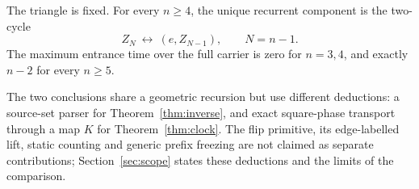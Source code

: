 \begin{theorem}\label{thm:clock}
The triangle is fixed. For every \(n\ge4\), the unique recurrent component
is the two-cycle
\[
 Z_N\ \longleftrightarrow\ (e,Z_{N-1}),\qquad N=n-1.
\]
The maximum entrance time over the full carrier is zero for \(n=3,4\),
and exactly \(n-2\) for every \(n\ge5\).
\end{theorem}

The two conclusions share a geometric recursion but use different
deductions: a source-set parser for Theorem~\ref{thm:inverse}, and exact
square-phase transport through a map \(K\) for Theorem~\ref{thm:clock}.
The flip primitive, its edge-labelled lift, static counting and generic
prefix freezing are not claimed as separate contributions; Section~\ref{sec:scope}
states these deductions and the limits of the comparison.

